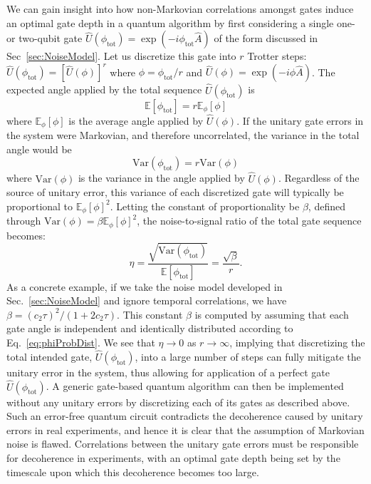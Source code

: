 \documentclass[prx,aps,twocolumn,showpacs,superscriptaddress,10pt]{revtex4-1}
\begin{document}
We can gain insight into how non-Markovian correlations amongst gates induce an optimal gate depth in a quantum algorithm by first considering a single one- or two-qubit gate $\hat{U}\left(\phi_\textrm{tot}\right)=\exp\left(-i\phi_\textrm{tot}\hat{A}\right)$ of the form discussed in Sec~\ref{sec:NoiseModel}. Let us discretize this gate into $r$ Trotter steps: $\hat{U}\left(\phi_\textrm{tot}\right)=\left[\hat{U}\left(\phi\right)\right]^{r}$ where $\phi=\phi_\textrm{tot}/r$ and  $\hat{U}\left(\phi\right)=\exp\left(-i\phi\hat{A}\right)$. The expected angle applied by the total sequence $\hat{U}\left(\phi_\textrm{tot}\right)$ is
\begin{equation}
	\mathbb{E}\left[\phi_\textrm{tot}\right] = r\mathbb{E}_{\phi}\left[\phi\right]
\end{equation}
where $\mathbb{E}_{\phi}\left[\phi\right]$ is the average angle applied by $\hat{U}\left(\phi\right)$. If the unitary gate errors in the system were Markovian, and therefore uncorrelated, the variance in the total angle would be
\begin{equation}
	\textrm{Var}\left(\phi_\textrm{tot}\right) = r\textrm{Var}\left(\phi\right)
\end{equation}
where $\textrm{Var}\left(\phi\right)$ is the variance in the angle applied by $\hat{U}\left(\phi\right)$. Regardless of the source of unitary error, this variance of each discretized gate will typically be proportional to $\mathbb{E}_{\phi}\left[\phi\right]^2$. Letting the constant of proportionality be $\beta$, defined through $\textrm{Var}\left(\phi\right)=\beta\mathbb{E}_{\phi}\left[\phi\right]^2$, the noise-to-signal ratio of the total gate sequence becomes:
\begin{equation}
	\eta=\frac{\sqrt{\textrm{Var}\left(\phi_\textrm{tot}\right)}}{\mathbb{E}\left[\phi_\textrm{tot}\right]}=\frac{\sqrt{\beta}}{r}.
\end{equation}
As a concrete example, if we take the noise model developed in Sec.~\ref{sec:NoiseModel} and ignore temporal correlations, we have $\beta=\left(c_{2}\tau\right)^{2}/(1+2c_{2}\tau)$. This constant $\beta$ is computed by assuming that each gate angle is independent and identically distributed according to Eq.~\eqref{eq:phiProbDist}. We see that $\eta\rightarrow0$ as $r\rightarrow\infty$, implying that discretizing the total intended gate, $\hat{U}\left(\phi_\textrm{tot}\right)$, into a large number of steps can fully mitigate the unitary error in the system, thus allowing for application of a perfect gate $\hat{U}\left(\phi_\textrm{tot}\right)$. A generic gate-based quantum algorithm can then be implemented without any unitary errors by discretizing each of its gates as described above. Such an error-free quantum circuit contradicts the decoherence caused by unitary errors in real experiments, and hence it is clear that the assumption of Markovian noise is flawed. Correlations between the unitary gate errors must be responsible for decoherence in experiments, with an optimal gate depth being set by the timescale upon which this decoherence becomes too large.
\end{document}
